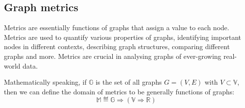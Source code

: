 %
%
%
%

\subsection{Graph metrics}

Metrics are essentially functions of graphs that assign a value to each node.
Metrics are used to quantify various properties of graphs, identifying important nodes in different contexts, describing graph structures, comparing different graphs and more.
Metrics are crucial in analysing graphs of ever-growing real-world data.

Mathematically speaking, if $\mathbb{G}$ is the set of all graphs $G = (V, E)$ with $V \subset \mathbb{V}$, then we can define the domain of metrics to be generally functions of graphs:
\begin{equation}
    \label{eq:metric_type_def}
    \mathbb{M} \eqdef \mathbb{G} \Rightarrow (\mathbb{V} \Rightarrow \mathbb{R})
\end{equation}


